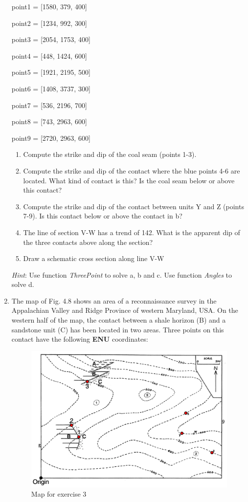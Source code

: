 \documentclass[a4paper , 12pt]{book}
\begin{document}
\begin{enumerate}
    point1 = [1580, 379, 400]
    
    point2 = [1234, 992, 300]
    
    point3 = [2054, 1753, 400]
    
    point4 = [448, 1424, 600]
    
    point5 = [1921, 2195, 500]
    
    point6 = [1408, 3737, 300]
    
    point7 = [536, 2196, 700]
    
    point8 = [743, 2963, 600]
    
    point9 = [2720, 2963, 600]
    
    \begin{enumerate}
        \item Compute the strike and dip of the coal seam (points 1-3).
        \item Compute the strike and dip of the contact where the blue points 4-6 are located. What kind of contact is this? Is the coal seam below or above this contact?
        \item Compute the strike and dip of the contact between units Y and Z (points 7-9). Is this contact below or above the contact in b?
        \item The line of section V-W has a trend of 142\degree. What is the apparent dip of the three contacts above along the section?
        \item Draw a schematic cross section along line V-W
    \end{enumerate}
    
    \textit{Hint}: Use function \textit{ThreePoint} to solve a, b and c. Use function \textit{Angles} to solve d.
    
    \item The map of Fig. 4.8 shows an area of a reconnaissance survey in the Appalachian Valley and Ridge Province of western Maryland, USA. On the western half of the map, the contact between a shale horizon (B) and a sandstone unit (C) has been located in two areas. Three points on this contact have the following \textbf{ENU} coordinates:
    
     \begin{figure}[ht]
    \centering
    \includegraphics[width=12cm]{Figures/ch4f9.png}
    \caption{Map for exercise 3}
    \end{figure}
    

\end{enumerate}
\end{document}
